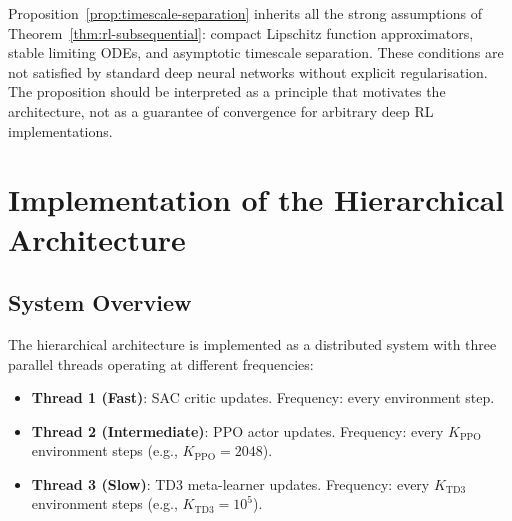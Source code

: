 \begin{remark}
Proposition~\ref{prop:timescale-separation} inherits all the strong assumptions of
Theorem~\ref{thm:rl-subsequential}: compact Lipschitz function approximators, stable
limiting ODEs, and asymptotic timescale separation. These conditions are not
satisfied by standard deep neural networks without explicit regularisation. The
proposition should be interpreted as a principle that motivates the architecture,
not as a guarantee of convergence for arbitrary deep RL implementations.
\end{remark}

\begin{table}[ht]
\centering
\caption{Timescale Separation Verification for LQ-MFG}
\label{tab:timescale-verification}
\end{table}


\section{Implementation of the Hierarchical Architecture}
\label{sec:hrl-implementation}

\subsection{System Overview}

The hierarchical architecture is implemented as a distributed system with three
parallel threads operating at different frequencies:

\begin{itemize}
    \item \textbf{Thread 1 (Fast)}: SAC critic updates. Frequency: every environment
    step.
    \item \textbf{Thread 2 (Intermediate)}: PPO actor updates. Frequency: every
    $K_{\mathrm{PPO}}$ environment steps (e.g., $K_{\mathrm{PPO}} = 2048$).
    \item \textbf{Thread 3 (Slow)}: TD3 meta-learner updates. Frequency: every
    $K_{\mathrm{TD3}}$ environment steps (e.g., $K_{\mathrm{TD3}} = 10^5$).
\end{itemize}

